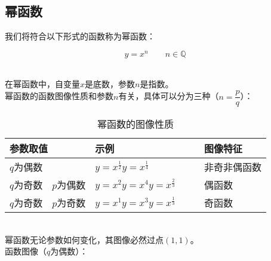 \documentclass[UTF8]{ctexart}
\begin{document}
\subsection{幂函数}
    我们将符合以下形式的函数称为幂函数：
    \begin{large}
        \begin{equation*}
            y=x^n\qquad n\in\mathbb{Q}
        \end{equation*}
    \end{large}\\
    在幂函数中，自变量$x$是底数，参数$n$是指数。\\[3mm]
    幂函数的函数图像性质和参数$n$有关，具体可以分为三种（$n=\dfrac{p}{q}$）：
    \begin{table}[h]
        \begin{center}
            \begin{tabular}{l|l|l}
                \hline
                参数取值&示例&图像特征\\ \hline
                $q$为偶数&$y=x^\frac{1}{2}$\quad$y=x^\frac{1}{4}$&非奇非偶函数\qquad\\ \hline
                $q$为奇数~~$p$为偶数\qquad\qquad&$y=x^2$\quad$y=x^4$\quad$y=x^{\frac{2}{3}}\qquad$&偶函数\\ \hline
                $q$为奇数~~$p$为奇数\qquad\qquad&$y=x^1$\quad$y=x^3$\quad$y=x^{\frac{1}{3}}\qquad$&奇函数\\ \hline
            \end{tabular}
            \caption{幂函数的图像性质}
        \end{center}
    \end{table}\\[3mm]
    幂函数无论参数如何变化，其图像必然过点$(1,1)$。\\[3mm]
    函数图像（$q$为偶数）：
\end{document}
